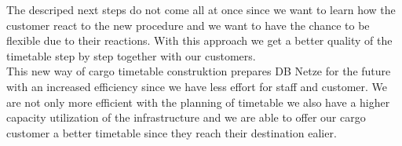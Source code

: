 The descriped next steps do not come all at once since we want to learn how the customer react to the new procedure and we want to have the chance to be flexible due to their reactions. With this approach we get a better quality of the timetable step by step together with our customers. \\
This new way of cargo timetable construktion prepares DB Netze for the future with an increased efficiency since we have less effort for staff and customer. We are not only more efficient with the planning of timetable we also have a higher capacity utilization of the infrastructure and we are able to offer our cargo customer a better timetable since they reach their destination ealier.   \\


